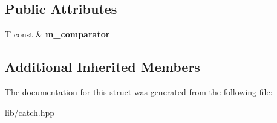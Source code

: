 \subsection*{Public Attributes}
\begin{DoxyCompactItemize}
\item 
\mbox{\label{struct_catch_1_1_matchers_1_1_vector_1_1_contains_element_matcher_ab7eada6c4bbce1d21b44773262f9cb23}} 
T const  \& {\bfseries m\+\_\+comparator}
\end{DoxyCompactItemize}
\subsection*{Additional Inherited Members}


The documentation for this struct was generated from the following file\+:\begin{DoxyCompactItemize}
\item 
lib/catch.\+hpp\end{DoxyCompactItemize}
